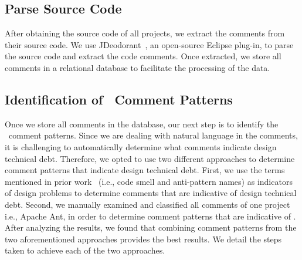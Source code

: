  
\subsection{Parse Source Code}

After obtaining the source code of all projects, we extract the comments from their source code. We use JDeodorant~\cite{Tsantalis2008CSMR}, an open-source Eclipse plug-in, to parse the source code and extract the code comments. Once extracted, we store all comments in a relational database to facilitate the processing of the data.


\subsection{Identification of \SADTD~Comment Patterns}
Once we store all comments in the database, our next step is to identify the \SADTD~comment patterns. Since we are dealing with natural language in the comments, it is challenging to automatically determine what comments indicate design technical debt. Therefore, we opted to use two different approaches to determine comment patterns that indicate design technical debt. First, we use the terms mentioned in prior work~\cite{fowler1999refactoring,brown1998antipatterns,martin2009clean} (i.e., code smell and anti-pattern names) as indicators of design problems to determine comments that are indicative of design technical debt. Second, we manually examined and classified all  comments of one project i.e., Apache Ant, in order to determine comment patterns that are indicative of \SADTD. After analyzing the results, we found that combining comment patterns from the two aforementioned approaches provides the best results. We detail the steps taken to achieve each of the two approaches.

